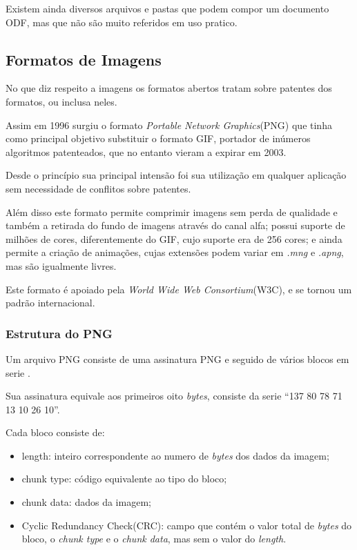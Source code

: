 Existem ainda diversos arquivos e pastas que podem compor um documento ODF, mas que não são muito referidos em uso pratico.


\subsection{Formatos de Imagens}

No que diz respeito a imagens os formatos abertos tratam sobre patentes dos formatos, ou inclusa neles.

Assim em 1996 surgiu o formato \textit{Portable Network Graphics}(PNG) que tinha como principal objetivo substituir o formato GIF, portador de inúmeros algoritmos patenteados, que no entanto vieram a expirar em 2003.

Desde o princípio sua principal intensão foi sua utilização em qualquer aplicação sem necessidade de conflitos sobre patentes.

Além disso este formato permite comprimir imagens sem perda de qualidade e também a retirada do fundo de imagens através do canal alfa; possui suporte de milhões de cores, diferentemente do GIF, cujo suporte era de 256 cores; e ainda permite a criação de animações, cujas extensões podem variar em \textit{.mng} e \textit{.apng}, mas são igualmente livres.

Este formato é apoiado pela \textit{World Wide Web Consortium}(W3C), e se tornou um padrão internacional.

\subsubsection{Estrutura do PNG}

Um arquivo PNG consiste de uma assinatura PNG e seguido de vários blocos em serie \cite{PNG-BOOK}.

Sua assinatura equivale aos primeiros oito \textit{bytes}, consiste da serie “137 80 78 71 13 10 26 10”.

Cada bloco consiste de:

\begin{itemize}
    \item{length: inteiro correspondente ao numero de \textit{bytes} dos dados da imagem;}
    \item{chunk type: código equivalente ao tipo do bloco;}
    \item{chunk data: dados da imagem;}
    \item{Cyclic Redundancy Check(CRC): campo que contém o valor total de \textit{bytes} do bloco, o \textit{chunk type} e o \textit{chunk data}, mas sem o valor do \textit{length}.}
\end{itemize}

